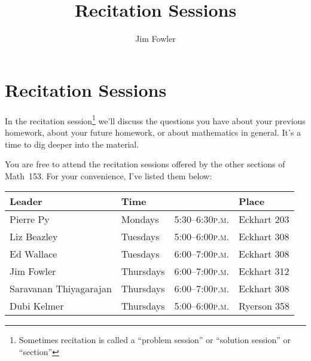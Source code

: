 \documentclass[12pt,letterpaper]{article}
\title{Recitation Sessions}
\author{Jim Fowler}
\newcommand{\peem}{\textsc{p.m.}}
\begin{document}
\section*{Recitation Sessions}

In the recitation session\footnote{Sometimes recitation is called a
  ``problem session'' or ``solution session'' or ``section''} we'll
discuss the questions you have about your previous homework, about
your future homework, or about mathematics in general.  It's a time to
dig deeper into the material.

You are free to attend the recitation sessions offered by the other
sections of Math~153.  For your convenience, I've listed them below:

\begin{center}
\begin{tabular}{llll}
\textbf{Leader} & \textbf{Time} & & \textbf{Place} \\
\hline
Pierre Py & Mondays & 5:30--6:30\peem & Eckhart 203 \\
Liz Beazley & Tuesdays & 5:00--6:00\peem & Eckhart 308 \\
Ed Wallace & Tuesdays & 6:00--7:00\peem & Eckhart 308 \\
Jim Fowler & Thursdays & 6:00--7:00\peem & Eckhart 312 \\
Saravanan Thiyagarajan & Thursdays & 6:00--7:00\peem & Eckhart 308 \\
Dubi Kelmer & Thursdays & 5:00--6:00\peem & Ryerson 358
\end{tabular}
\end{center}
\end{document}
